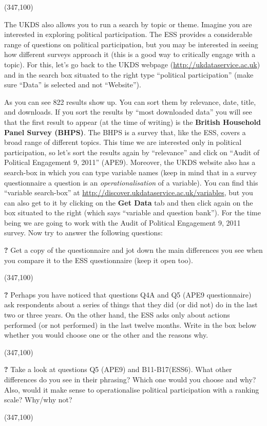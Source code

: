 \framebox(347,100){}

The UKDS also allows you to run a search by topic or theme. Imagine you are interested in exploring political participation. The ESS provides a considerable range of questions on political participation, but you may be interested in seeing how different surveys approach it (this is a good way to critically engage with a topic). For this, let's go back to the UKDS webpage (\url{http://ukdataservice.ac.uk}) and in the search box situated to the right type ``political participation'' (make sure ``Data'' is selected and not ``Website'').

As you can see 822 results show up. You can sort them by relevance, date, title, and downloads. If you sort the results by ``most downloaded data'' you will see that the first result to appear (at the time of writing) is the \textbf{British Household Panel Survey (BHPS)}. The BHPS is a survey that, like the ESS, covers a broad range of different topics. This time we are interested only in political participation, so let's sort the results again by ``relevance'' and click on ``Audit of Political Engagement 9, 2011'' (APE9). Moreover, the UKDS website also has a search-box in which you can type variable names (keep in mind that in a survey questionnaire a question is an \textit{operationalisation} of a variable). You can find this ``variable search-box'' at \url{http://discover.ukdataservice.ac.uk/variables}, but you can also get to it by clicking on the \textbf{Get Data} tab and then click again on the box situated to the right (which says ``variable and question bank''). For the time being we are going to work with the Audit of Political Engagement 9, 2011 survey. Now try to answer the following questions:

\pagebreak

\forceindent \textbf{?} Get a copy of the questionnaire and jot down the main differences you see when you compare it to the ESS questionnaire (keep it open too).

\framebox(347,100){}

\forceindent \textbf{?} Perhaps you have noticed that questions Q4A and Q5 (APE9 questionnaire) ask respondents about a series of things that they did (or did not) do in the last two or three years. On the other hand, the ESS asks only about actions performed (or not performed) in the last twelve months. Write in the box below whether you would choose one or the other and the reasons why.

\framebox(347,100){}

\forceindent \textbf{?} Take a look at questions Q5 (APE9) and B11-B17(ESS6). What other differences do you see in their phrasing? Which one would you choose and why? Also, would it make sense to operationalise political participation with a ranking scale? Why/why not?

\framebox(347,100){}
